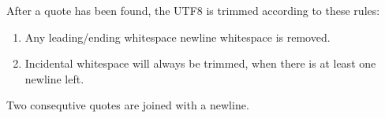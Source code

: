 \documentclass[10pt,a4paper]{article}
\begin{document}
After a quote has been found, the UTF8 is trimmed according to these rules:
\begin{enumerate}
\item{Any leading/ending whitespace newline whitespace is removed.}
\item{Incidental whitespace will always be trimmed, when there is at least one newline left.}
\end{enumerate}

Two consequtive quotes are joined with a newline.
\end{document}
